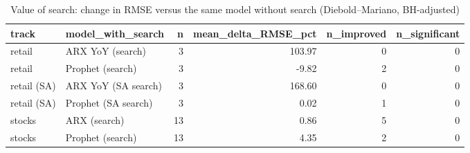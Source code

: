 \begin{table}[t]
\scriptsize
\centering
\caption{Value of search: change in RMSE versus the same model without search (Diebold--Mariano, BH-adjusted)}
\label{tab:value_of_search}
\begin{tabular}{llrrrr}
\toprule
track & model\_with\_search & n & mean\_delta\_RMSE\_pct & n\_improved & n\_significant \\
\midrule
retail & ARX YoY (search) & 3 & 103.97 & 0 & 0 \\
retail & Prophet (search) & 3 & -9.82 & 2 & 0 \\
retail (SA) & ARX YoY (SA search) & 3 & 168.60 & 0 & 0 \\
retail (SA) & Prophet (SA search) & 3 & 0.02 & 1 & 0 \\
stocks & ARX (search) & 13 & 0.86 & 5 & 0 \\
stocks & Prophet (search) & 13 & 4.35 & 2 & 0 \\
\bottomrule
\end{tabular}
\end{table}
